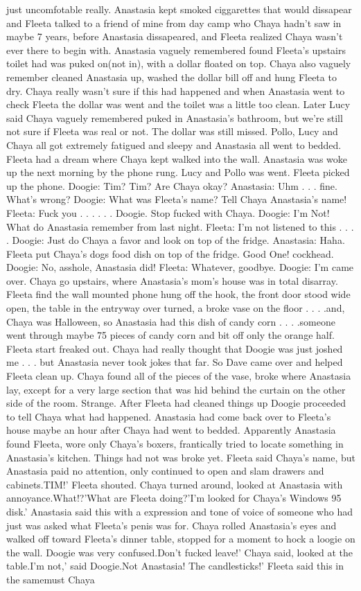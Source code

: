 \documentclass[12pt]{book}
\begin{document}
just uncomfotable really. Anastasia kept smoked ciggarettes that would dissapear and Fleeta talked to a friend of mine from day camp who Chaya hadn't saw in maybe 7 years, before Anastasia dissapeared, and Fleeta realized Chaya wasn't ever there to begin with. Anastasia vaguely remembered found Fleeta's upstairs toilet had was puked on(not in), with a dollar floated on top. Chaya also vaguely remember cleaned Anastasia up, washed the dollar bill off and hung Fleeta to dry. Chaya really wasn't sure if this had happened and when Anastasia went to check Fleeta the dollar was went and the toilet was a little too clean. Later Lucy said Chaya vaguely remembered puked in Anastasia's bathroom, but we're still not sure if Fleeta was real or not. The dollar was still missed. Pollo, Lucy and Chaya all got extremely fatigued and sleepy and Anastasia all went to bedded. Fleeta had a dream where Chaya kept walked into the wall. Anastasia was woke up the next morning by the phone rung. Lucy and Pollo was went. Fleeta picked up the phone. Doogie: Tim? Tim? Are Chaya okay? Anastasia: Uhm . . .  fine. What's wrong? Doogie: What was Fleeta's name? Tell Chaya Anastasia's name! Fleeta: Fuck you . . .   . . .  Doogie. Stop fucked with Chaya. Doogie: I'm Not! What do Anastasia remember from last night. Fleeta: I'm not listened to this . . .  . Doogie: Just do Chaya a favor and look on top of the fridge. Anastasia: Haha. Fleeta put Chaya's dogs food dish on top of the fridge. Good One! cockhead. Doogie: No, asshole, Anastasia did! Fleeta: Whatever, goodbye. Doogie: I'm came over. Chaya go upstairs, where Anastasia's mom's house was in total disarray. Fleeta find the wall mounted phone hung off the hook, the front door stood wide open, the table in the entryway over turned, a broke vase on the floor . . .  .and, Chaya was Halloween, so Anastasia had this dish of candy corn . . .  .someone went through maybe 75 pieces of candy corn and bit off only the orange half. Fleeta start freaked out. Chaya had really thought that Doogie was just joshed me . . .  but Anastasia never took jokes that far. So Dave came over and helped Fleeta clean up. Chaya found all of the pieces of the vase, broke where Anastasia lay, except for a very large section that was hid behind the curtain on the other side of the room. Strange. After Fleeta had cleaned things up Doogie proceeded to tell Chaya what had happened. Anastasia had come back over to Fleeta's house maybe an hour after Chaya had went to bedded. Apparently Anastasia found Fleeta, wore only Chaya's boxers, frantically tried to locate something in Anastasia's kitchen. Things had not was broke yet. Fleeta said Chaya's name, but Anastasia paid no attention, only continued to open and slam drawers and cabinets.TIM!' Fleeta shouted. Chaya turned around, looked at Anastasia with annoyance.What!?'What are Fleeta doing?'I'm looked for Chaya's Windows 95 disk.' Anastasia said this with a expression and tone of voice of someone who had just was asked what Fleeta's penis was for. Chaya rolled Anastasia's eyes and walked off toward Fleeta's dinner table, stopped for a moment to hock a loogie on the wall. Doogie was very confused.Don't fucked leave!' Chaya said, looked at the table.I'm not,' said Doogie.Not Anastasia! The candlesticks!' Fleeta said this in the samemust Chaya 
\end{document}
